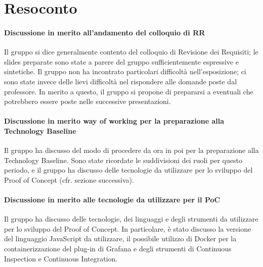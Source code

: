 \documentclass{article}
\begin{document}
\section{Resoconto}%
\label{resoconto}
\paragraph*{Discussione in merito all'andamento del colloquio di RR}
Il gruppo si dice generalmente contento del colloquio di Revisione dei Requisiti; le slides preparate sono state a parere del gruppo sufficientemente espressive e sintetiche. Il gruppo non ha incontrato particolari difficoltà nell'esposizione; ci sono state invece delle lievi difficoltà nel rispondere alle domande poste dal professore. In merito a questo, il gruppo si propone di prepararsi a eventuali che potrebbero essere poste nelle successive presentazioni.

\paragraph*{Discussione in merito way of working per la preparazione alla Technology Baseline}
Il gruppo ha discusso del modo di procedere da ora in poi per la preparazione alla Technology Baseline. Sono state ricordate le suddivisioni dei ruoli per questo periodo, e il gruppo ha discusso delle tecnologie da utilizzare per lo sviluppo del Proof of Concept (cfr. sezione successiva).

\paragraph*{Discussione in merito alle tecnologie da utilizzare per il PoC}
Il gruppo ha discusso delle tecnologie, dei linguaggi e degli strumenti da utilizzare per lo sviluppo del Proof of Concept. In particolare, è stato discusso la versione del linguaggio JavaScript da utilizzare, il possibile utilizzo di Docker per la containerizzazione del plug-in di Grafana e degli strumenti di Continuous Inspection e Continuous Integration.
\end{document}
